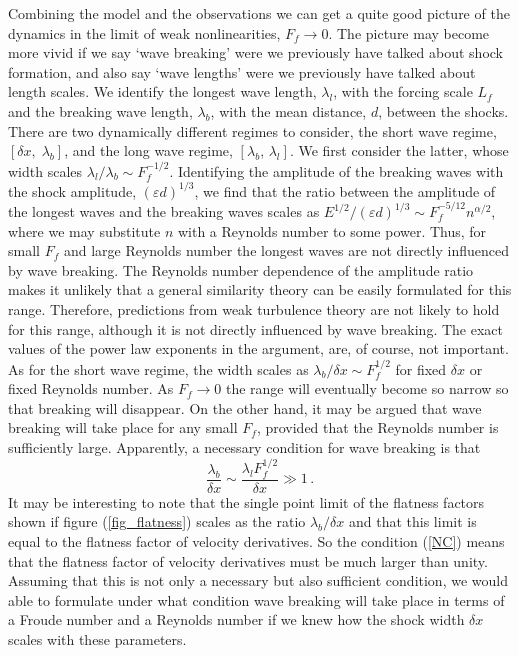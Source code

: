 \documentclass{jfm}
\newcommand{\eps}{\varepsilon}
\begin{document}
Combining the model and the observations we can get a quite good picture of the dynamics in the limit of weak nonlinearities, $ F_{f} \rightarrow  0 $.  
The picture may become more vivid if we say `wave breaking' were we previously have talked about shock formation, and also say
`wave lengths' were we previously have talked about length scales. We identify the longest wave length, $ \lambda_l $,  with the forcing scale $  L_f $ and the breaking wave length, $ \lambda_b $, with the mean distance, $ d $, between the shocks. There are two dynamically different  regimes to consider, the short wave  regime, $ [\delta x, \; \lambda_b] $, and the long wave regime, $ [\lambda_b, \, \lambda_l] $. We first consider the latter, whose width scales  $ \lambda_{l} /\lambda_b \sim F_f^{-1/2} $. Identifying the amplitude of the breaking waves with the shock amplitude, $ (\eps d)^{1/3} $, we find that the ratio between the amplitude of the longest waves and the breaking waves scales as $ E^{1/2}/(\eps d)^{1/3} \sim F_{f}^{-5/12} n^{\alpha/2} $, where we may substitute  $ n $ with a Reynolds number to some power.  Thus, for small $ F_f $ and large Reynolds number the longest waves are not directly influenced by wave breaking. The Reynolds number dependence of the amplitude ratio makes it unlikely that a general similarity theory can be easily formulated for this range. Therefore, predictions from weak turbulence theory \cite[for example][]{ZakharovSagdeev1970}
are not likely to hold for this range, although it is not directly influenced by wave breaking. The exact values of the power law exponents in the argument, are, of course, not important. As for the short wave regime, the width scales as $  \lambda_b /\delta x \sim F_f^{1/2} $ for fixed $ \delta x $ or fixed Reynolds number. As $ F_{f} \rightarrow 0 $ the range will eventually become so narrow so that breaking will disappear. On the other hand, it may be argued that wave breaking will take place for any small $ F_f $, provided that the Reynolds number is sufficiently large. Apparently, a necessary condition for wave breaking is that
\begin{equation} \label{NC}
\frac{\lambda_b}{\delta x} \sim \frac{\lambda_l F_f^{1/2}}{\delta x} \gg 1 \, .
\end{equation}
It may be interesting to note that the single point limit of the flatness factors shown if figure (\ref{fig_flatness}) scales as the ratio $ \lambda_b/\delta x $ and that this limit is equal to the flatness factor of velocity derivatives. So the condition (\ref{NC}) means that the flatness factor of velocity derivatives must be much larger than unity. Assuming that this is not only a necessary but also sufficient condition, we would able to formulate under what condition wave breaking will take place in terms of a Froude number and a Reynolds number if we knew how the shock width $ \delta x $ scales with these parameters.
\end{document}
